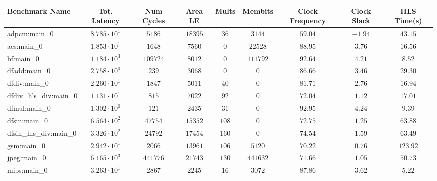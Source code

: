 \begin{tabular}{|l|c|c|c|c|c|c|c|c|}
\hline
Benchmark Name          & Tot. Latency           & Num Cycles & Area LE    & Mults   & Membits    & Clock Frequency & Clock Slack & HLS Time(s) \\
\hline
adpcm:main\_0           & $ 8.785 \cdot 10^{1} $ & $ 5186   $ & $ 18395  $ & $ 36  $ & $ 3144   $ & $ 59.04       $ & $ -1.94   $ & $ 43.15   $ \\
aes:main\_0             & $ 1.853 \cdot 10^{1} $ & $ 1648   $ & $ 7560   $ & $ 0   $ & $ 22528  $ & $ 88.95       $ & $ 3.76    $ & $ 16.56   $ \\
bf:main\_0              & $ 1.184 \cdot 10^{3} $ & $ 109724 $ & $ 8012   $ & $ 0   $ & $ 111792 $ & $ 92.64       $ & $ 4.21    $ & $ 8.52    $ \\
dfadd:main\_0           & $ 2.758 \cdot 10^{0} $ & $ 239    $ & $ 3068   $ & $ 0   $ & $ 0      $ & $ 86.66       $ & $ 3.46    $ & $ 29.30   $ \\
dfdiv:main\_0           & $ 2.260 \cdot 10^{1} $ & $ 1847   $ & $ 5011   $ & $ 40  $ & $ 0      $ & $ 81.71       $ & $ 2.76    $ & $ 16.94   $ \\
dfdiv\_hls\_div:main\_0 & $ 1.131 \cdot 10^{1} $ & $ 815    $ & $ 7022   $ & $ 92  $ & $ 0      $ & $ 72.04       $ & $ 1.12    $ & $ 17.01   $ \\
dfmul:main\_0           & $ 1.302 \cdot 10^{0} $ & $ 121    $ & $ 2435   $ & $ 31  $ & $ 0      $ & $ 92.95       $ & $ 4.24    $ & $ 9.39    $ \\
dfsin:main\_0           & $ 6.564 \cdot 10^{2} $ & $ 47754  $ & $ 15352  $ & $ 108 $ & $ 0      $ & $ 72.75       $ & $ 1.25    $ & $ 63.88   $ \\
dfsin\_hls\_div:main\_0 & $ 3.326 \cdot 10^{2} $ & $ 24792  $ & $ 17454  $ & $ 160 $ & $ 0      $ & $ 74.54       $ & $ 1.59    $ & $ 63.49   $ \\
gsm:main\_0             & $ 2.942 \cdot 10^{1} $ & $ 2066   $ & $ 13961  $ & $ 106 $ & $ 5120   $ & $ 70.22       $ & $ 0.76    $ & $ 123.92  $ \\
jpeg:main\_0            & $ 6.165 \cdot 10^{3} $ & $ 441776 $ & $ 21743  $ & $ 130 $ & $ 441632 $ & $ 71.66       $ & $ 1.05    $ & $ 50.73   $ \\
mips:main\_0            & $ 3.263 \cdot 10^{1} $ & $ 2867   $ & $ 2245   $ & $ 16  $ & $ 3072   $ & $ 87.86       $ & $ 3.62    $ & $ 5.22    $ \\

\end{tabular}
